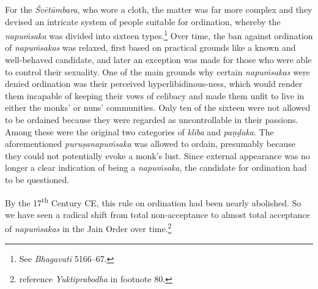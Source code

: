 For the \textit{Śvētāmbara}, who wore a cloth, the matter was far more complex and they devised an intricate system of people suitable for ordination, whereby the \textit{napuṁsaka} was divided into sixteen types.\footnote{See \textit{Bhagavatī} 5166–67.} Over time, the ban against ordination of \textit{napuṁsakas} was relaxed, first based on practical grounds like a known and well-behaved candidate, and later an exception was made for those who were able to control their sexuality. One of the main grounds why certain \textit{napuṁsakas} were denied ordination was their perceived hyperlibidinous-ness, which would render them incapable of keeping their vows of celibacy and made them unfit to live in either the monks' or nuns' communities. Only ten of the sixteen were not allowed to be ordained because they were regarded as uncontrollable in their passions. Among these were the original two categories of \textit{klība} and \textit{paṇḍaka}. The aforementioned \textit{puruṣanapuṁsaka} was allowed to ordain, presumably because they could not potentially evoke a monk's lust. Since external appearance was no longer a clear indication of being a \textit{napuṁsaka}, the candidate for ordination had to be questioned. 

By the 17\textsuperscript{th} Century CE, this rule on ordination had been nearly abolished. So we have seen a radical shift from total non-acceptance to almost total acceptance of \textit{napuṁsakas} in the Jain Order over time.\footnote{\cite{zwilling} reference \textit{Yuktiprabodha} in footnote 80.}
